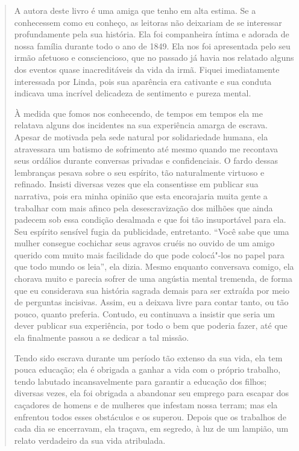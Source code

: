 \begin{quote}
A autora deste livro é uma amiga que
tenho em alta estima. Se a conhecessem como eu conheço, as leitoras não
deixariam de se interessar profundamente pela sua história. Ela foi
companheira íntima e adorada de nossa família durante todo o ano de
1849. Ela nos foi apresentada pelo seu irmão afetuoso e consciencioso,
que no passado já havia nos relatado alguns dos eventos quase
inacreditáveis da vida da irmã. Fiquei imediatamente interessada por
Linda, pois sua aparência era cativante e sua conduta indicava uma
incrível delicadeza de sentimento e pureza mental.

À medida que fomos nos conhecendo, de
tempos em tempos ela me relatava alguns dos incidentes na sua
experiência amarga de escrava. Apesar de motivada pela sede natural por
solidariedade humana, ela atravessara um batismo de sofrimento até mesmo
quando me recontava seus ordálios durante conversas privadas e
confidenciais. O fardo dessas lembranças pesava sobre o seu espírito,
tão naturalmente virtuoso e refinado. Insisti diversas vezes que ela
consentisse em publicar sua narrativa, pois era minha opinião que esta
encorajaria muita gente a trabalhar com mais afinco pela desescravização
dos milhões que ainda padecem sob essa condição desalmada e que foi tão
insuportável para ela. Seu espírito sensível fugia da publicidade,
entretanto. ``Você sabe que uma mulher consegue cochichar seus agravos
cruéis no ouvido de um amigo querido com muito mais facilidade do que
pode colocá"-los no papel para que todo mundo os leia'', ela dizia. Mesmo
enquanto conversava comigo, ela chorava muito e parecia sofrer de uma
angústia mental tremenda, de forma que eu considerava sua história
sagrada demais para ser extraída por meio de perguntas incisivas. Assim,
eu a deixava livre para contar tanto, ou tão pouco, quanto preferia.
Contudo, eu continuava a insistir que seria um dever publicar sua
experiência, por todo o bem que poderia fazer, até que ela finalmente
passou a se dedicar a tal missão.

Tendo sido escrava durante um período
tão extenso da sua vida, ela tem pouca educação; ela é obrigada a ganhar
a vida com o próprio trabalho, tendo labutado incansavelmente para
garantir a educação dos filhos; diversas vezes, ela foi obrigada a
abandonar seu emprego para escapar dos caçadores de homens e de mulheres
que infestam nossa terram; mas ela enfrentou todos esses obstáculos e os
superou. Depois que os trabalhos de cada dia se encerravam, ela traçava,
em segredo, à luz de um lampião, um relato verdadeiro da sua vida
atribulada.


\end{quote}
